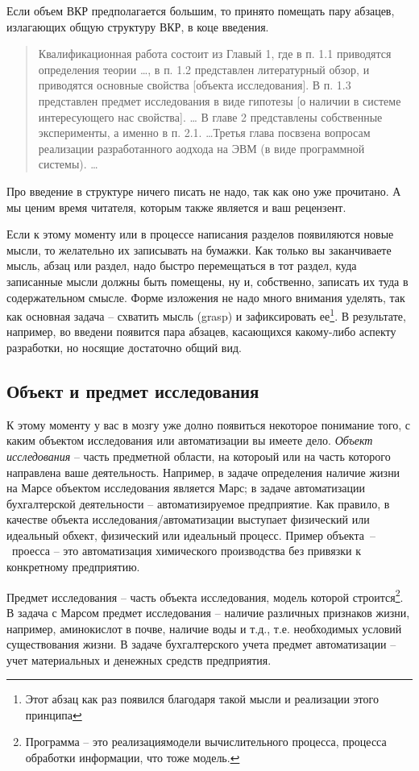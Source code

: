 \documentclass[a4paper,14pt,final]{extreport}
\begin{document}
Если объем ВКР предполагается большим, то принято помещать пару абзацев, излагающих общую структуру ВКР, в коце введения.

\begin{quote}
  Квалификационная работа состоит из Главый 1, где в п. 1.1 приводятся определения теории \ldots{}, в п. 1.2 представлен литературный обзор, и приводятся основные свойства [объекта исследования].  В п. 1.3 представлен предмет исследования в виде гипотезы [о наличии в системе интересующего нас свойства].  \ldots{} В главе 2 представлены собственные эксперименты, а именно в п. 2.1. \ldots Третья глава посвзена вопросам реализации разработанного аодхода на ЭВМ (в виде программной системы).  \ldots{}
 \end{quote}
Про введение в структуре ничего писать не надо, так как оно уже прочитано.  А мы ценим время читателя, которым также является и ваш рецензент.

Если к этому моменту или в процессе написания разделов появиляются новые мысли, то желательно их записывать на бумажки.  Как только вы заканчиваете мысль, абзац или раздел, надо быстро перемещаться в тот раздел, куда записанные мысли должны быть помещены, ну и, собственно, записать их туда в содержательном смысле.  Форме изложения не надо много внимания уделять, так как основная задача -- схватить мысль (grasp) и зафиксировать ее\footnote{Этот абзац как раз появился благодаря такой мысли и реализации этого принципа}.  В результате, например, во введени появится пара абзацев, касающихся какому-либо аспекту разработки, но носящие достаточно общий вид.

\subsection{Объект и предмет исследования}
К этому моменту у вас в мозгу уже долно появиться некоторое понимание того, с каким объектом исследования или автоматизации вы имеете дело.  \emph{Объект исследования} -- часть предметной области, на котороый или на часть которого направлена ваше деятельность.  Например, в задаче определения наличие жизни на Марсе объектом исследования является Марс; в задаче автоматизации бухгалтерской деятельности -- автоматизируемое предприятие.  Как правило, в качестве объекта исследования/автоматизации выступает физический или идеальный обхект, физический или идеальный процесс.  Пример объекта~--~проесса -- это автоматизация химического производства без привязки к конкретному предприятию.

Предмет исследования -- часть объекта исследования, модель которой строится\footnote{Программа -- это реализациямодели вычислительного процесса, процесса обработки информации, что тоже модель.}.  В задача с Марсом предмет исследования -- наличие различных признаков жизни, например, аминокислот в почве, наличие воды и т.д., т.е. необходимых условий существования жизни.  В задаче бухгалтерского учета предмет автоматизации -- учет материальных и денежных средств предприятия.
\end{document}
